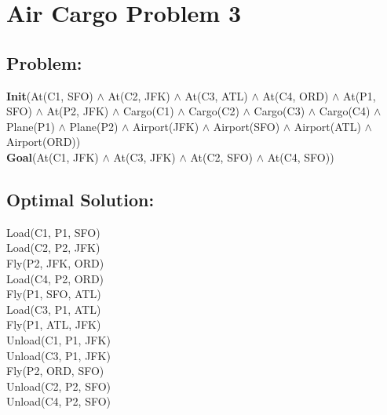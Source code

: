 \documentclass[]{article}
\begin{document}
\section{Air Cargo Problem 3}
\subsection*{Problem:}
\textbf{Init}(At(C1, SFO) $ \wedge $ At(C2, JFK) $ \wedge $ At(C3, ATL) $ \wedge $ At(C4, ORD) 
$ \wedge $ At(P1, SFO) $ \wedge $ At(P2, JFK) 
$ \wedge $ Cargo(C1) $ \wedge $ Cargo(C2) $ \wedge $ Cargo(C3) $ \wedge $ Cargo(C4)
$ \wedge $ Plane(P1) $ \wedge $ Plane(P2)
$ \wedge $ Airport(JFK) $ \wedge $ Airport(SFO) $ \wedge $ Airport(ATL) $ \wedge $ Airport(ORD))\\
\textbf{Goal}(At(C1, JFK) $ \wedge $ At(C3, JFK) $ \wedge $ At(C2, SFO) $ \wedge $ At(C4, SFO))
\subsection*{Optimal Solution:}
Load(C1, P1, SFO)\\
Load(C2, P2, JFK)\\
Fly(P2, JFK, ORD)\\
Load(C4, P2, ORD)\\
Fly(P1, SFO, ATL)\\
Load(C3, P1, ATL)\\
Fly(P1, ATL, JFK)\\
Unload(C1, P1, JFK)\\
Unload(C3, P1, JFK)\\
Fly(P2, ORD, SFO)\\
Unload(C2, P2, SFO)\\
Unload(C4, P2, SFO)\\
\end{document}
